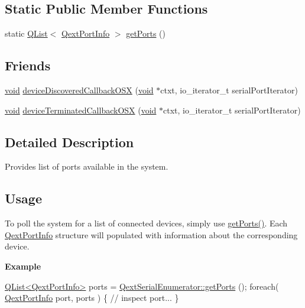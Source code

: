 \subsection*{Static Public Member Functions}
\begin{DoxyCompactItemize}
\item 
static \hyperlink{class_q_list}{Q\-List}$<$ \hyperlink{struct_qext_port_info}{Qext\-Port\-Info} $>$ \hyperlink{class_qext_serial_enumerator_a7b0e5f76259ae0651ea23763decc2642}{get\-Ports} ()
\end{DoxyCompactItemize}
\subsection*{Friends}
\begin{DoxyCompactItemize}
\item 
\hyperlink{group___u_a_v_objects_plugin_ga444cf2ff3f0ecbe028adce838d373f5c}{void} \hyperlink{class_qext_serial_enumerator_a69d01ffddbb90484952f088074a0f3f3}{device\-Discovered\-Callback\-O\-S\-X} (\hyperlink{group___u_a_v_objects_plugin_ga444cf2ff3f0ecbe028adce838d373f5c}{void} $\ast$ctxt, io\-\_\-iterator\-\_\-t serial\-Port\-Iterator)
\item 
\hyperlink{group___u_a_v_objects_plugin_ga444cf2ff3f0ecbe028adce838d373f5c}{void} \hyperlink{class_qext_serial_enumerator_aa51a522b4e644e64fc04beedf482e370}{device\-Terminated\-Callback\-O\-S\-X} (\hyperlink{group___u_a_v_objects_plugin_ga444cf2ff3f0ecbe028adce838d373f5c}{void} $\ast$ctxt, io\-\_\-iterator\-\_\-t serial\-Port\-Iterator)
\end{DoxyCompactItemize}


\subsection{Detailed Description}
Provides list of ports available in the system.\hypertarget{class_qxt_proxy_style_Usage}{}\subsection{Usage}\label{class_qxt_proxy_style_Usage}
To poll the system for a list of connected devices, simply use \hyperlink{class_qext_serial_enumerator_a7b0e5f76259ae0651ea23763decc2642}{get\-Ports()}. Each \hyperlink{struct_qext_port_info}{Qext\-Port\-Info} structure will populated with information about the corresponding device.

{\bfseries Example} 
\begin{DoxyCode}
\hyperlink{class_q_list}{QList<QextPortInfo>} ports = \hyperlink{class_qext_serial_enumerator_a7b0e5f76259ae0651ea23763decc2642}{QextSerialEnumerator::getPorts}
      ();
\textcolor{keywordflow}{foreach}( \hyperlink{struct_qext_port_info}{QextPortInfo} port, ports ) \{
    \textcolor{comment}{// inspect port...}
\}
\end{DoxyCode}


